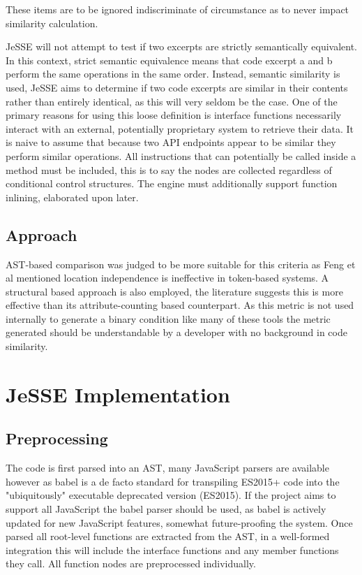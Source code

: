 \documentclass[jou,apacite]{apa6}
\begin{document}
These items are to be ignored indiscriminate of circumstance as to never impact similarity calculation. 

JeSSE will not attempt to test if two excerpts are strictly semantically equivalent. In this context,  strict semantic equivalence means that code excerpt a and b perform the same operations in the same order. Instead, semantic similarity is used, JeSSE aims to determine if two code excerpts are similar in their contents rather than entirely identical, as this will very seldom be the case. One of the primary reasons for using this loose definition is interface functions necessarily interact with an external, potentially proprietary system to retrieve their data. It is naive to assume that because two API endpoints appear to be similar they perform similar operations. 
All instructions that can potentially be called inside a method must be included, this is to say the nodes are collected regardless of conditional control structures. The engine must additionally support function inlining, elaborated upon later.

\subsection{Approach}
AST-based comparison was judged to be more suitable for this criteria as Feng et al mentioned location independence is ineffective in token-based systems. A structural based approach is also employed, the literature suggests this is more effective than its attribute-counting based counterpart. As this metric is not used internally to generate a binary condition like many of these tools the metric generated should be understandable by a developer with no background in code similarity.

\section{JeSSE Implementation}
\subsection{Preprocessing}
The code is first parsed into an AST, many JavaScript parsers are available however as babel is a de facto standard for transpiling ES2015+ code into the "ubiquitously" executable deprecated version (ES2015). If the project aims to support all JavaScript the babel parser should be used, as babel is actively updated for new JavaScript features, somewhat future-proofing the system. Once parsed all root-level functions are extracted from the AST,  in a well-formed integration this will include the interface functions and any member functions they call. All function nodes are preprocessed individually.
\end{document}
